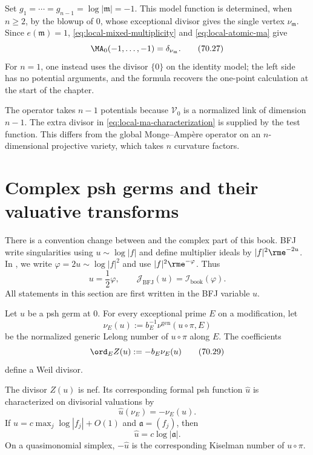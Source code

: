 \begin{example}
Set $g_1=\cdots=g_{n-1}=\log|\mathfrak m|=-1$.  This model function is
determined, when $n\geq2$, by the blowup of $0$, whose exceptional
divisor gives the single vertex $\nu_{\mathfrak m}$.  Since
$e(\mathfrak m)=1$, \eqref{eq:local-mixed-multiplicity} and
\eqref{eq:local-atomic-ma} give
\[
              \MA_0(-1,\ldots,-1)=\delta_{\nu_{\mathfrak m}}.
\tag{70.27}\label{eq:local-maximal-ideal-dirac}
\]
For $n=1$, one instead uses the divisor $\{0\}$ on the identity model;
the left side has no potential arguments, and the formula recovers the
one-point calculation at the start of the chapter.
\end{example}

The operator takes $n-1$ potentials because $\mathcal V_0$ is a
normalized link of dimension $n-1$.  The extra divisor in
\eqref{eq:local-ma-characterization} is supplied by the test function.  This
differs from the global Monge--Amp\`ere operator on an $n$-dimensional
projective variety, which takes $n$ curvature factors.

\section{Complex psh germs and their valuative transforms}
\label{sec:local-valuative-transform}

There is a convention change between \cite{BFJ08} and the complex part of
this book.  BFJ write singularities using $u\sim\log|f|$ and define
multiplier ideals by $|f|^2\rme^{-2u}$.  In
, we write
$\varphi=2u\sim\log|f|^2$ and use
$|f|^2\rme^{-\varphi}$.  Thus
\[
             u=\frac12\varphi,
 \qquad
             \mathcal J_{\mathrm{BFJ}}(u)
                =\mathcal I_{\mathrm{book}}(\varphi).
\tag{70.28}\label{eq:local-convention-firewall}
\]
All statements in this section are first written in the BFJ variable $u$.

Let $u$ be a psh germ at $0$.  For every exceptional prime $E$ on a
modification, let
\[
 \nu_E(u):=b_E^{-1}\nu^{\mathrm{gen}}(u\circ\pi,E)
\]
be the normalized generic Lelong number of $u\circ\pi$ along $E$.
The coefficients
\[
                         \ord_E Z(u):=-b_E\nu_E(u)
\tag{70.29}\label{eq:local-psh-divisor}
\]
define a Weil divisor.

\begin{theorem}\label{thm:local-valuative-transform}
The divisor $Z(u)$ is nef.  Its corresponding formal psh function
$\widehat u$ is characterized on divisorial valuations by
\[
                            \widehat u(\nu_E)=-\nu_E(u).
\tag{70.30}\label{eq:local-valuative-transform-divisorial}
\]
If $u=c\max_j\log|f_j|+O(1)$ and
$\mathfrak a=(f_j)$, then
\[
                            \widehat u=c\log|\mathfrak a|.
\tag{70.31}\label{eq:local-analytic-ideal-transform}
\]
On a quasimonomial simplex, $-\widehat u$ is the corresponding Kiselman
number of $u\circ\pi$.
\end{theorem}


